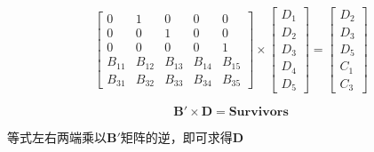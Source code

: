 \documentclass[UTF8,12pt]{ctexart}
\begin{document}
\[
\left[
\begin{matrix}
0 & 1 & 0 & 0 & 0\\
0 & 0 & 1 & 0 & 0\\
0 & 0 & 0 & 0 & 1\\
B_{11} & B_{12} & B_{13} & B_{14} & B_{15}\\
B_{31} & B_{32} & B_{33} & B_{34} & B_{35}
\end{matrix}
\right]
\times
\left[
\begin{matrix}
D_1\\
D_2\\
D_3\\
D_4\\
D_5
\end{matrix}
\right]
=
\left[
\begin{matrix}
D_2\\
D_3\\
D_5\\
C_1\\
C_3
\end{matrix}
\right]
\]


\[
\boldsymbol{B'} \times \boldsymbol{D} = \boldsymbol{Survivors}
\]


等式左右两端乘以$\boldsymbol{B'}$矩阵的逆，即可求得$\boldsymbol{D}$

\end{document}
